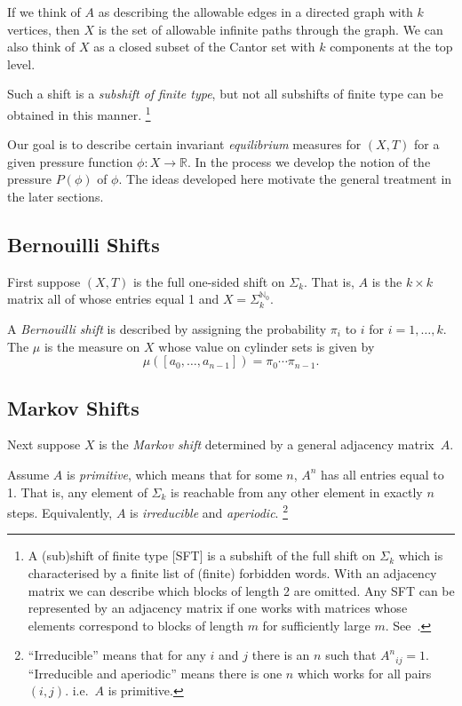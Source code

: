 \documentclass[a4paper]{amsart}
\theoremstyle{plain}
\theoremstyle{definition}
\theoremstyle{remark}
\begin{document}
If we think of $ A $ as describing  the allowable edges in a directed graph with $ k $ vertices, then $   X $ is the set of allowable infinite paths through the graph. We can also think of $ X $ as a  closed subset of the Cantor set with $ k $ components at the top level.

Such a shift is a \emph{subshift of finite type}, but not all subshifts of finite type can be obtained in this manner.%
\footnote{A (sub)shift of finite type [SFT] is a subshift of the full shift on $ \Sigma_k $ which is characterised by a finite list of (finite) forbidden words.  With an adjacency matrix we can describe which blocks of length 2 are omitted.
Any SFT   can  be represented by an adjacency matrix if one works with matrices whose elements correspond to blocks of length $ m $ for sufficiently large $ m $.  
See~\cite{Wil}.}


\medskip Our goal is to describe certain invariant \emph{equilibrium} measures for $ (X,T) $ for a given pressure  function  $ \phi :X\to \mathbb{R} $.  In the process we develop the notion of the pressure $ P(\phi) $ of $ \phi $.  The ideas developed here motivate the general treatment in the later sections.

\subsection{Bernouilli   Shifts}  First suppose $ (X,T) $ is the full one-sided shift on $ \Sigma_k $.  That is, $ A $ is the $k \times k $ matrix all of whose entries equal 1 and $ X =\Sigma_k^{\mathbb{N}_0} $.  

A \emph{Bernouilli shift} is described by assigning the probability $ \pi_i $ to $ i $ for $ i =1,\dots, k $.  The $ \mu $ is the measure on $ X $ whose value on cylinder sets is given by 
\[
 \mu( [a_0,\dots , a_{n-1} ]) = \pi_0\cdots \pi_{n-1}.
 \]
 
\subsection{Markov Shifts} Next suppose $ X $ is the \emph{Markov shift} determined  by a general  adjacency matrix~$ A $. 

Assume $ A $ is \emph{primitive},   which means that for some $ n $, $ A^n $ has all entries equal to 1.  That is, any element of $ \Sigma_k $ is reachable from any other element in exactly $ n $ steps.   Equivalently, $ A $ is \emph{irreducible} and \emph{aperiodic}.%
\footnote{``Irreducible'' means that for any $ i $ and $ j $ there is an $ n $ such that $ {A^n}_{ij} =1$.  ``Irreducible and aperiodic'' means there is one $ n $ which works for all pairs $ (i,j) $. i.e.\ $ A $ is primitive.}
\end{document}
